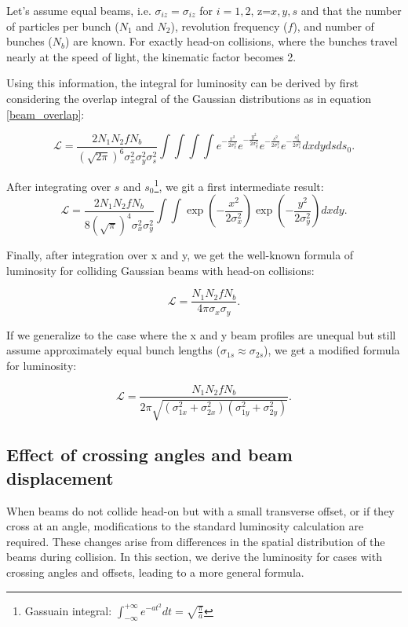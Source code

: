 Let's assume equal beams, i.e.  $\sigma_{iz} = \sigma_{iz}$ for $i=1,2$, z=$x,y,s$ and that the number of particles per bunch (\( N_1 \) and \( N_2 \)), revolution frequency (\( f \)), and number of bunches (\( N_b \)) are known. For exactly head-on collisions, where the bunches travel nearly at the speed of light, the kinematic factor becomes 2.

Using this information, the integral for luminosity can be derived by first considering the overlap integral of the Gaussian distributions as in equation \eqref{beam_overlap}:

\begin{equation}
\mathcal{L} = \frac{2  N_1 N_2 f N_b}{(\sqrt{2\pi})^6 \sigma_x^2\sigma_y^2\sigma_s^2}\int\int\int\int e^{-\frac{x^2}{2 \sigma_x^2}} e^{-\frac{y^2}{2 \sigma_y^2}} e^{-\frac{s^2}{2 \sigma_s^2}}e^{-\frac{s_0^2}{2 \sigma_s^2}}dxdydsds_0.
\end{equation}

After integrating over $s$ and $s_0$\footnote{Gassuain integral: $\int_{-\infty}^{+\infty}e^{-at^2}dt = \sqrt{\tfrac{\pi}{a}}$}, we git a first intermediate result:
\begin{equation}
    \mathcal{L} = \frac{2  N_1 N_2 f N_b}{8(\sqrt{\pi})^4 \sigma_x^2\sigma_y^2}\int\int \exp\left(-\frac{x^2}{2 \sigma_x^2}\right) \exp\left(-\frac{y^2}{2 \sigma_y^2}\right) dxdy .
\end{equation}

Finally, after integration over x and y, we get the well-known formula of luminosity for colliding Gaussian beams with head-on collisions:

\begin{equation}
\mathcal{L} = \frac{N_1  N_2  f N_b}{4 \pi  \sigma_x \sigma_y}.
\end{equation}

If we generalize to the case where the x and y beam profiles are unequal but still assume approximately equal bunch lengths (\( \sigma_{1s} \approx \sigma_{2s} \)), we get a modified formula for luminosity:

\begin{equation}
\mathcal{L} = \frac{N_1  N_2  f  N_b}{2 \pi \sqrt{(\sigma_{1x}^2 + \sigma_{2x}^2)(\sigma_{1y}^2 + \sigma_{2y}^2)}}.
\end{equation}

\subsection{Effect of crossing angles and beam displacement}
When beams do not collide head-on but with a small transverse offset, or if they cross at an angle, modifications to the standard luminosity calculation are required. These changes arise from differences in the spatial distribution of the beams during collision. In this section, we derive the luminosity for cases with crossing angles and offsets, leading to a more general formula.


